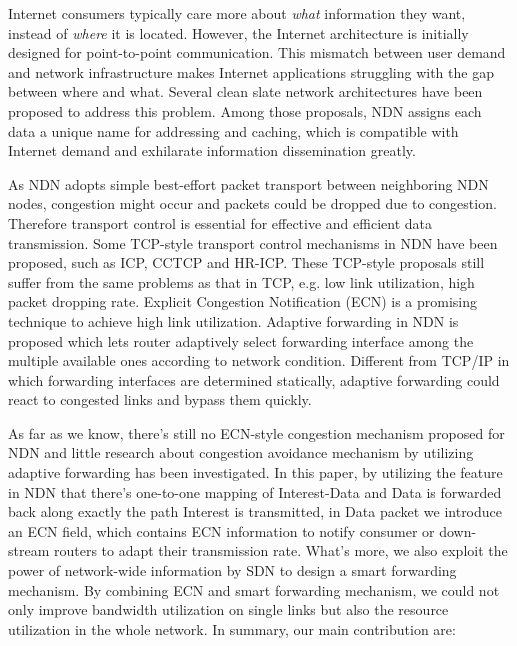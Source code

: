 
Internet consumers typically care more about \emph{what} information they want, instead of \emph{where} it is located. However, the Internet architecture is initially designed for point-to-point communication. This mismatch between user demand and network infrastructure makes Internet applications struggling with the gap between where and what. Several clean slate network architectures have been proposed to address this problem. Among those proposals, NDN\cite{NDN} assigns each data a unique name for addressing and caching, which is compatible with Internet demand and exhilarate information dissemination greatly.


As NDN adopts simple best-effort packet transport between neighboring NDN nodes, congestion might occur and packets could be dropped due to congestion. Therefore transport control is essential for effective and efficient data transmission. Some TCP-style transport control mechanisms in NDN have been proposed, such as ICP\cite{ICP}, CCTCP\cite{CCTCP} and HR-ICP\cite{shape}. These TCP-style proposals still suffer from the same problems as that in TCP, e.g. low link utilization, high packet dropping rate. Explicit Congestion Notification (ECN) is a promising technique to achieve high link utilization\cite{XCP}. Adaptive forwarding\cite{Adaptive} in NDN is proposed which lets router adaptively select forwarding interface among the multiple available ones according to network condition. Different from TCP/IP in which forwarding interfaces are determined statically, adaptive forwarding could react to congested links and bypass them quickly.

As far as we know, there's still no ECN-style congestion mechanism proposed for NDN and little research about congestion avoidance mechanism by utilizing adaptive forwarding has been investigated. In this paper, by utilizing the feature in NDN that there's one-to-one mapping of Interest-Data and Data is forwarded back along exactly the path Interest is transmitted, in Data packet we introduce an ECN field, which contains ECN information to notify consumer or down-stream routers to adapt their transmission rate. What's more, we also exploit the power of network-wide information by SDN\cite{SDN} to design a smart forwarding mechanism. By combining ECN and smart forwarding mechanism, we could not only improve bandwidth utilization on single links but also the resource utilization in the whole network. In summary, our main contribution are:

